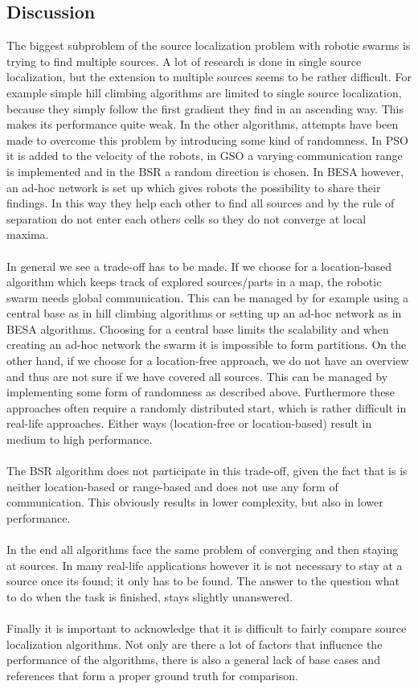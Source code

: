 	\subsection{Discussion}
  	The biggest subproblem of the source localization problem with robotic swarms is trying to find multiple sources. 
	A lot of research is done in single source localization, but the extension to multiple sources seems to be rather difficult. 
	For example simple hill climbing algorithms are limited to single source localization, because they simply follow the first gradient they find in an ascending way.
	This makes its performance quite weak. 
	In the other algorithms, attempts have been made to overcome this problem by introducing some kind of randomness. 
	In PSO it is added to the velocity of the robots, in GSO a varying communication range is implemented and in the BSR a random direction is chosen. 
	In BESA however, an ad-hoc network is set up which gives robots the possibility to share their findings. 
	In this way they help each other to find all sources and by the rule of separation do not enter each others cells so they do not converge at local maxima. \\
	\\
	In general we see a trade-off has to be made. 
	If we choose for a location-based algorithm which keeps track of explored sources/parts in a map, the robotic swarm needs global communication. 
	This can be managed by for example using a central base as in hill climbing algorithms or setting up an ad-hoc network as in BESA algorithms. 
	Choosing for a central base limits the scalability and when creating an ad-hoc network the swarm it is impossible to form partitions. 
	On the other hand, if we choose for a location-free approach, we do not have an overview and thus are not sure if we have covered all sources. 
	This can be managed by implementing some form of randomness as described above. 
	Furthermore these approaches often require a randomly distributed start, which is rather difficult in real-life approaches. 
	Either ways (location-free or location-based) result in medium to high performance.\\
	\\
	The BSR algorithm does not participate in this trade-off, given the fact that is is neither location-based or range-based and does not use any form of communication. This obviously results in lower complexity, but also in lower performance. \\
	\\
	In the end all algorithms face the same problem of converging and then staying at sources. In many real-life applications however it is not necessary to stay at a source once its found; it only has to be found. The answer to the question what to do when the task is finished, stays slightly unanswered.\\
	\\
	Finally it is important to acknowledge that it is difficult to fairly compare source localization algorithms. Not only are there a lot of factors that influence the performance of the algorithms, there is also a general lack of base cases and references that form a proper ground truth for comparison.

